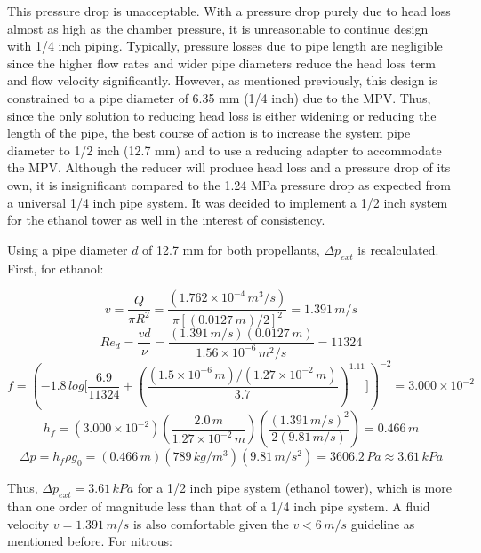 \documentclass[9pt]{article} %
\numberwithin{equation}{section} %
\begin{document}
This pressure drop is unacceptable. With a pressure drop purely due to head loss almost as high as the chamber pressure, it is unreasonable to continue design with 1/4 inch piping. Typically, pressure losses due to pipe length are negligible since the higher flow rates and wider pipe diameters reduce the head loss term and flow velocity significantly. However, as mentioned previously, this design is constrained to a pipe diameter of 6.35 mm (1/4 inch) due to the MPV. Thus, since the only solution to reducing head loss is either widening or reducing the length of the pipe, the best course of action is to increase the system pipe diameter to 1/2 inch (12.7 mm) and to use a reducing adapter to accommodate the MPV. Although the reducer will produce head loss and a pressure drop of its own, it is insignificant compared to the 1.24 MPa pressure drop as expected from a universal 1/4 inch pipe system. It was decided to implement a 1/2 inch system for the ethanol tower as well in the interest of consistency.

Using a pipe diameter $d$ of 12.7 mm for both propellants, $\Delta p_{ext}$ is recalculated. First, for ethanol:

\begin{equation*}
v = \frac{Q}{\pi R^{2}} = \frac{(1.762 \times 10^{-4}\, m^{3}/s)}{\pi [(0.0127\, m) / 2]^{2}} = 1.391\, m/s
\end{equation*}
\begin{equation*}
Re_{d} = \frac{v d}{\nu} = \frac{(1.391\, m/s)(0.0127\, m)}{1.56 \times 10^{-6}\, m^{2}/s} = 11324
\end{equation*}
\begin{equation*}
f = \left( -1.8\, log \Bigg[ \frac{6.9}{11324} + \left( \frac{(1.5 \times 10^{-6}\, m)/(1.27 \times 10^{-2}\, m)}{3.7} \right) ^{1.11} \Bigg] \right)^{-2} = 3.000 \times 10^{-2}
\end{equation*}
\begin{equation*}
h_{f} = (3.000 \times 10^{-2}) \left( \frac{2.0\, m}{1.27 \times 10^{-2}\, m} \right) \left( \frac{(1.391\, m/s)^{2}}{2 (9.81\, m/s)} \right) = 0.466 \, m
\end{equation*}
\begin{equation*}
\Delta p = h_{f} \rho g_{0} = (0.466 \, m)(789 \, kg/m^{3})(9.81 \, m/s^{2}) = 3606.2 \, Pa \approx 3.61 \, kPa
\end{equation*}

Thus, $\Delta p_{ext} = 3.61 \, kPa$ for a 1/2 inch pipe system (ethanol tower), which is more than one order of magnitude less than that of a 1/4 inch pipe system. A fluid velocity $v = 1.391 \, m/s$ is also comfortable given the $v < 6 \, m/s$ guideline as mentioned before. For nitrous:
\end{document}
